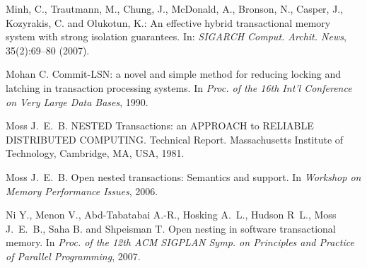 \begin{thebibliography}{99}
{
Minh, C., Trautmann, M., Chung, J., McDonald, A., Bronson, N., Casper, J., Kozyrakis, C. and Olukotun, K.:
An effective hybrid transactional memory system with strong isolation guarantees.
In: {\it SIGARCH Comput. Archit. News}, 35(2):69--80 (2007).





Mohan C.
\newblock Commit-{LSN}: a novel and simple method for reducing locking and
  latching in transaction processing systems.
\newblock In {\em Proc. of the 16th Int'l Conference on Very Large Data Bases},
  1990.




Moss J.~E.~B.
\newblock NESTED Transactions: an APPROACH to RELIABLE DISTRIBUTED COMPUTING.
\newblock Technical Report. Massachusetts Institute of Technology, Cambridge, MA, USA, 1981.

Moss J.~E.~B.
\newblock Open nested transactions: Semantics and support.
\newblock In {\em Workshop on Memory Performance Issues}, 2006.





Ni Y., Menon V., Abd-Tabatabai A.-R., Hosking A.~L.,
  Hudson R~L., Moss J.~E.~B., Saha B. and Shpeisman T.
\newblock Open nesting in software transactional memory.
\newblock In {\em Proc. of the 12th ACM SIGPLAN Symp. on Principles and
  Practice of Parallel Programming}, 2007.


% 


}
\end{thebibliography}
